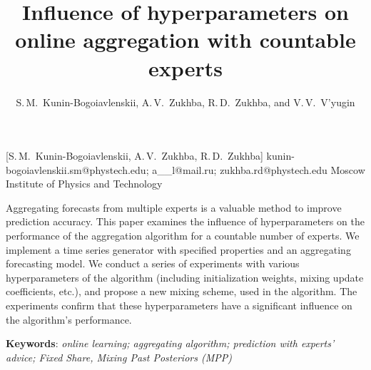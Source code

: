 \documentclass[12pt, twoside]{article}
\begin{document}
\English

\title
    [] %
    {Influence of hyperparameters on online aggregation with countable experts} %
\author
    [S.\,M.~Kunin-Bogoiavlenskii] %
    {S.\,M.~Kunin-Bogoiavlenskii, A.\,V.~Zukhba, R.\,D.~Zukhba, and V.\,V.~V’yugin} %
    [S.\,M.~Kunin-Bogoiavlenskii, A.\,V.~Zukhba, R.\,D.~Zukhba] %
\email
    {kunin-bogoiavlenskii.sm@phystech.edu; a\_\_l@mail.ru; zukhba.rd@phystech.edu}
\organization
    {Moscow Institute of Physics and Technology}
\abstract
    {

    Aggregating forecasts from multiple experts is a valuable method to improve prediction accuracy.
    This paper examines the influence of hyperparameters on the performance of the aggregation algorithm for a countable number of experts.
    We implement a time series generator with specified properties and an aggregating forecasting model. 
    We conduct a series of experiments with various hyperparameters of the algorithm (including initialization weights, mixing update coefficients, etc.), and propose a new mixing scheme, used in the algorithm.
    The experiments confirm that these hyperparameters have a significant influence on the algorithm's performance.           
        
%   
%   
%   
%               
    \noindent
        \textbf{Keywords}: \emph{online learning; aggregating algorithm; prediction with experts’ advice; Fixed Share, Mixing Past Posteriors (MPP)}}
\end{document}
